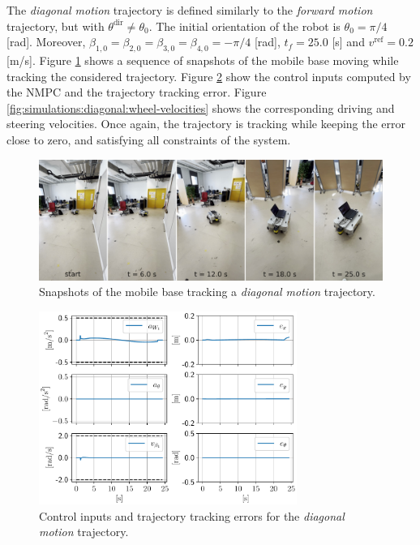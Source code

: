The \textit{diagonal motion} trajectory is defined similarly to the
\textit{forward motion} trajectory, but with $\theta^{\mathrm{dir}} \ne \theta_0$.
The initial orientation of the robot is $\theta_0=\pi/4$ [rad].
Moreover, $\beta_{1,0}=\beta_{2,0}=\beta_{3,0}=\beta_{4,0}=-\pi/4$ [rad], $t_f = 25.0$
[s] and $v^{\mathrm{ref}}=0.2$ [m/s].
Figure \ref{fig:experiments:diagonal:snapshots} shows a sequence of snapshots of
the mobile base moving while tracking the considered trajectory.
Figure \ref{fig:simulations:diagonal:inputs-and-errors} show the control
inputs computed by the NMPC and the trajectory tracking error.
Figure \ref{fig:simulations:diagonal:wheel-velocities} shows the corresponding
driving and steering velocities. Once again, the trajectory is tracking while 
keeping the error close to zero, and satisfying all constraints of the system.
\begin{figure}
    \centering
    \includegraphics[width=\textwidth]{figures/SWMR/simulations/diagonal/snapshots.jpeg}
    \caption{Snapshots of the mobile base tracking a \textit{diagonal motion} trajectory.}
    \label{fig:experiments:diagonal:snapshots}
\end{figure}
\begin{figure}
    \centering
    \includegraphics[width=0.75\textwidth]{figures/SWMR/simulations/diagonal/inputs_and_errors.pdf}
    \caption{Control inputs and trajectory tracking errors for the
        \textit{diagonal motion} trajectory.}
    \label{fig:simulations:diagonal:inputs-and-errors}
\end{figure}
